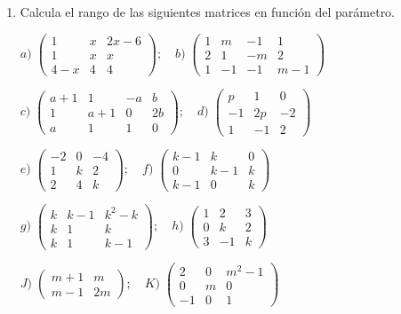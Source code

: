 \begin{enumerate}
\item Calcula el rango de las siguientes matrices en función del parámetro.

$a)\; \left( \begin{matrix} 1& x& 2x-6 \\1& x& x \\4-x& 4& 4 \end{matrix} \right) ; \quad  b)\;  \left( \begin{matrix} 1&m&-1&1\\2&1&-m&2\\1&-1&-1&m-1 \end{matrix} \right)$

$c)\; \left( \begin{matrix} a+1&1&-a&b\\1&a+1&0&2b\\a&1&1&0 \end{matrix} \right) ; \quad  d)\;  \left( \begin{matrix} p&1&0\\-1&2p&-2\\1&-1&2 \end{matrix} \right)$

$e)\; \left( \begin{matrix} -2&0&-4\\1&k&2\\2&4&k \end{matrix} \right) ; \quad  f)\;  \left( \begin{matrix} k-1&k&0\\0&k-1&k\\k-1&0&k \end{matrix} \right)$

$g)\; \left( \begin{matrix} k&k-1&k^2-k\\k&1&k\\k&1&k-1 \end{matrix} \right) ; \quad  h)\;  \left( \begin{matrix} 1&2&3\\0&k&2\\3&-1&k \end{matrix} \right)$

$J)\; \left( \begin{matrix} m+1&m\\m-1&2m \end{matrix} \right) ; \quad  K)\;  \left( \begin{matrix} 2&0&m^2-1\\0&m&0\\-1&0&1 \end{matrix} \right)$



\end{enumerate}
